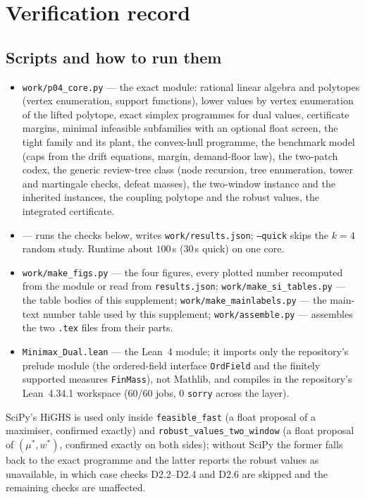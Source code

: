 \section{Verification record}\label{si:verification}

\subsection{Scripts and how to run them}
\begin{itemize}[leftmargin=1.4em,itemsep=1pt]
\item \texttt{work/p04\_core.py} --- the exact module: rational linear algebra and polytopes (vertex enumeration, support functions), lower values by vertex enumeration of the lifted polytope, exact simplex programmes for dual values, certificate margins, minimal infeasible subfamilies with an optional float screen, the tight family and its plant, the convex-hull programme, the benchmark model (caps from the drift equations, margin, demand-floor law), the two-patch codex, the generic review-tree class (node recursion, tree enumeration, tower and martingale checks, defeat masses), the two-window instance and the inherited instances, the coupling polytope and the robust values, the integrated certificate.
\item {} --- runs the checks below, writes \texttt{work/results.json}; \texttt{--quick} skips the $k=4$ random study. Runtime about $100$\,s ($30$\,s quick) on one core.
\item \texttt{work/make\_figs.py} --- the four figures, every plotted number recomputed from the module or read from \texttt{results.json}; \texttt{work/make\_si\_tables.py} --- the table bodies of this supplement; \texttt{work/make\_mainlabels.py} --- the main-text number table used by this supplement; \texttt{work/assemble.py} --- assembles the two \texttt{.tex} files from their parts.
\item \texttt{Minimax\_Dual.lean} --- the Lean~4 module; it imports only the repository's prelude module (the ordered-field interface \texttt{OrdField} and the finitely supported measures \texttt{FinMass}), not Mathlib, and compiles in the repository's Lean~4.34.1 workspace (60/60 jobs, 0 \texttt{sorry} across the layer).
\end{itemize}
SciPy's HiGHS is used only inside \texttt{feasible\_fast} (a float proposal of a maximiser, confirmed exactly) and \texttt{robust\_values\_two\_window} (a float proposal of $(\mu^\ast,w^\ast)$, confirmed exactly on both sides); without SciPy the former falls back to the exact programme and the latter reports the robust values as unavailable, in which case checks D2.2--D2.4 and D2.6 are skipped and the remaining checks are unaffected.

